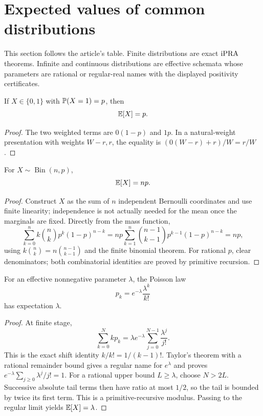 \section{Expected values of common distributions}\label{sec:distributions}

This section follows the article's table.  Finite distributions are exact
\(\mathrm{iPRA}\) theorems.  Infinite and continuous distributions are effective
schemata whose parameters are rational or regular-real names with the displayed
positivity certificates.

\begin{proposition}[Bernoulli]\label{prop:bernoulli}
If \(X\in\{0,1\}\) with \(\mathbb P(X=1)=p\), then
\[
 \mathbb E[X]=p.
\]
\end{proposition}

\begin{proof}
The two weighted terms are \(0(1-p)\) and \(1p\).  In a natural-weight
presentation with weights \(W-r,r\), the equality is
\((0(W-r)+r)/W=r/W\).
\end{proof}

\begin{proposition}[Binomial]\label{prop:binomial}
For \(X\sim\operatorname{Bin}(n,p)\),
\[
 \mathbb E[X]=np.
\]
\end{proposition}

\begin{proof}
Construct \(X\) as the sum of \(n\) independent Bernoulli coordinates and use
finite linearity; independence is not actually needed for the mean once the
marginals are fixed.  Directly from the mass function,
\[
 \sum_{k=0}^{n}k\binom nkp^k(1-p)^{n-k}
 =np\sum_{k=1}^{n}\binom{n-1}{k-1}p^{k-1}(1-p)^{n-k}=np,
\]
using \(k\binom nk=n\binom{n-1}{k-1}\) and the finite binomial theorem.  For
rational \(p\), clear denominators; both combinatorial identities are proved by
primitive recursion.
\end{proof}

\begin{proposition}[Poisson]\label{prop:poisson}
For an effective nonnegative parameter \(\lambda\), the Poisson law
\[
 p_k=e^{-\lambda}\frac{\lambda^k}{k!}
\]
has expectation \(\lambda\).
\end{proposition}

\begin{proof}
At finite stage,
\[
 \sum_{k=0}^{N}kp_k
 =\lambda e^{-\lambda}\sum_{j=0}^{N-1}\frac{\lambda^j}{j!}.
\]
This is the exact shift identity \(k/k!=1/(k-1)!\).  Taylor's theorem with a
rational remainder bound gives a regular name for \(e^\lambda\) and proves
\(e^{-\lambda}\sum_{j\ge0}\lambda^j/j!=1\).  For a rational upper bound
\(L\ge\lambda\), choose \(N>2L\).  Successive absolute tail terms then have
ratio at most \(1/2\), so the tail is bounded by twice its first term.  This is
a primitive-recursive modulus.  Passing to the regular limit yields
\(\mathbb E[X]=\lambda\).
\end{proof}

